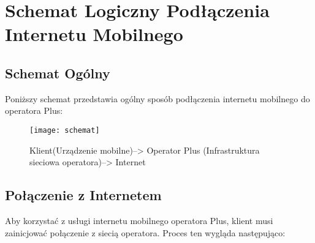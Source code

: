 
\section{Schemat Logiczny Podłączenia Internetu Mobilnego}

    \subsection{Schemat Ogólny}
    Poniższy schemat przedstawia ogólny sposób podłączenia internetu mobilnego do operatora Plus:

    \begin{figure}[!htb]
        \centering
        \texttt{[image: schemat]}
        \caption{Klient(Urządzenie mobilne)--> Operator Plus (Infrastruktura sieciowa operatora)--> Internet}
    \end{figure}



    \subsection{Połączenie z Internetem}

    Aby korzystać z usługi internetu mobilnego operatora Plus, klient musi zainicjować połączenie z siecią operatora. Proces ten wygląda następująco:
    

